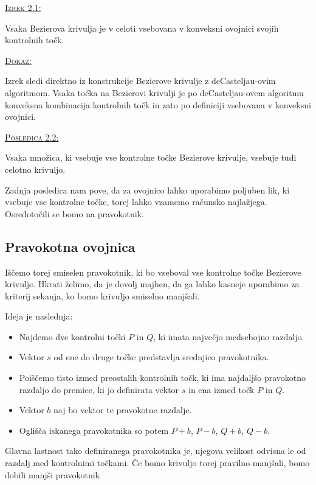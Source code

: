 \documentclass[a4paper, 12pt]{article} %
\newenvironment{matematika}[1]{
{\underline{\textsc{#1:}}}
}{
}
\begin{document}
\begin{matematika}{Izrek 2.1}
Vsaka Bezierova krivulja je v celoti vsebovana v konveksni ovojnici svojih kontrolnih točk.
\end{matematika}

\begin{matematika}{Dokaz}
Izrek sledi direktno iz konstrukcije Bezierove krivulje z deCasteljau-ovim algoritmom. Vsaka točka na Bezierovi krivulji je po deCasteljau-ovem algoritmu konveksna kombinacija kontrolnih točk in zato po definiciji vsebovana v konveksni ovojnici.
\end{matematika}

\begin{matematika}{Posledica 2.2}
Vsaka množica, ki vsebuje vse kontrolne točke Bezierove krivulje, vsebuje tudi celotno krivuljo.
\end{matematika}

Zadnja posledica nam pove, da za ovojnico lahko uporabimo poljuben lik, ki vsebuje vse kontrolne točke, torej lahko vzamemo računsko najlažjega. Osredotočili se bomo na pravokotnik.

\subsection{Pravokotna ovojnica}
Iščemo torej smiselen pravokotnik, ki bo vseboval vse kontrolne točke Bezierove krivulje. Hkrati želimo, da je dovolj majhen, da ga lahko kasneje uporabimo za kriterij sekanja, ko bomo krivuljo smiselno manjšali.

Ideja je naslednja:
\begin{itemize}
\item Najdemo dve kontrolni točki $P$ in $Q$, ki imata največjo medsebojno razdaljo.
\item Vektor $s$ od ene do druge točke predstavlja srednjico pravokotnika.
\item Poiščemo tisto izmed preostalih kontrolnih točk, ki ima najdaljšo pravokotno razdaljo do premice, ki jo definirata vektor $s$ in ena izmed točk $P$ in $Q$.
\item Vektor $b$ naj bo vektor te pravokotne razdalje.
\item Oglišča iskanega pravokotnika so potem $P + b$, $P - b$, $Q + b$, $Q - b$.
\end{itemize}

Glavna lastnost tako definiranega pravokotnika je, njegova velikost odvisna le od razdalj med kontrolnimi točkami. Če bomo krivuljo torej pravilno manjšali, bomo dobili manjši pravokotnik
\end{document}
